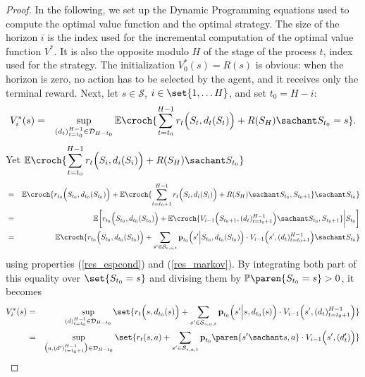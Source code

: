 \begin{proof}
In the following, we set up the Dynamic Programming equations
used to compute the optimal value function and the optimal strategy.
The size of the horizon $i$ is the index used for the incremental computation 
of the optimal value function $V^*$. 
It is also the opposite modulo $H$ of the stage of the process $t$,
index used for the strategy. 
The initialization $V^*_0(s)=R(s)$ is obvious: 
when the horizon is zero, no action has to be selected by the agent,
and it receives only the terminal reward. 
Next, let $s \in \mathcal{S}$, $i \in \set{1,\ldots H}$, 
and set $t_0 = H-i$:
\begin{eqnarray*}
V^*_{i}(s) & = & \sup_{(d_{t})_{t=t_0}^{H-1} \in \mathcal{D}_{H-t_0}} 
\mathbb{E} \croch{ \sum_{t=t_0}^{H-1} r_t\Big(S_t,d_t(S_t)\Big) + R(S_H) \sachant S_{t_0}=s }.
\end{eqnarray*}
Yet $ \displaystyle \mathbb{E} \croch{ \sum_{t=t_0}^{H-1} r_t\Big(S_i,d_i(S_i)\Big) + R(S_H) \sachant S_{t_0} } $
\begin{eqnarray*}
& = & \mathbb{E} \croch{ r_{t_0}\Big(S_{t_0},d_{t_0}(S_{t_0})\Big) 
+ \mathbb{E} \croch{  \sum_{t=t_0+1}^{H-1} r_t\Big(S_i,d_i(S_i)\Big) + R(S_H) \sachant S_{t_0},S_{t_0+1} } \sachant S_{t_0} } \\
& = & \mathbb{E} \bigg[ r_{t_0}\Big(S_{t_0},d_{t_0}(S_{t_0})\Big) 
+ \mathbb{E} \croch{  V_{i-1}\Big(S_{t_0+1},(d_t)_{t=t_0+1}^{H-1}\Big) \sachant S_{t_0},S_{t_0+1} } \bigg\vert S_{t_0} \bigg] \\
& = & \mathbb{E} \croch{ r_{t_0}\Big(S_{t_0},d_{t_0}(S_{t_0}) \Big) 
+ \sum_{s' \in \mathcal{S}_{s,a,t}} \textbf{p}_{t_0} \Big( s' \Big\vert S_{t_0} , d_{t_0}(S_{t_0}) \Big) \cdot V_{i-1}\Big(s',(d_t)_{t=t_0+1}^{H-1}\Big) \sachant S_{t_0} } \\
\end{eqnarray*}
using properties (\ref{res_espcond}) and (\ref{res_markov}).
By integrating both part of this equality over $\set{ S_{t_0}=s }$ 
and divising them by $\mathbb{P} \paren{ S_{t_0}=s } > 0$,
it becomes
\begin{eqnarray}
\nonumber V^*_{i}(s) & = & \sup_{(d)_{t=t_0}^{H-1} \in \mathcal{D}_{H - t_0} } \set{  r_t \Big( s,d_{t_0}(s) \Big) 
+ \sum_{s' \in \mathcal{S}_{s,a,t}} \textbf{p}_{t_0} \Big( s' \Big\vert s , d_{t_0}(s) \Big) \cdot V_{i-1} \Big( s',(d_t)_{t=t_0+1}^{H-1} \Big) } \\
\nonumber & = & \sup_{ \big(a,(d')_{t=t_0+1}^{H-1}\big) \in \mathcal{D}_{H-t_0} } \set{ r_t(s,a) 
+ \sum_{s' \in \mathcal{S}_{s,a,t}} \textbf{p}_{t_0} \paren{s' \sachant s , a } \cdot V_{i-1} \Big( s',(d_t') \Big) } \\

\end{eqnarray}
\end{proof}
